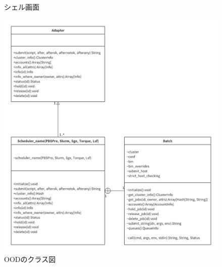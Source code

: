 \begin{figure}[t]
    \centering
    \caption{シェル画面}
    \label{shell}
\end{figure}

\begin{figure}[b]
    \centering
    \includegraphics[width=120mm]{./fig/class_diagram.png}
    \caption{OODのクラス図}
    \label{class_diagram}
\end{figure}

